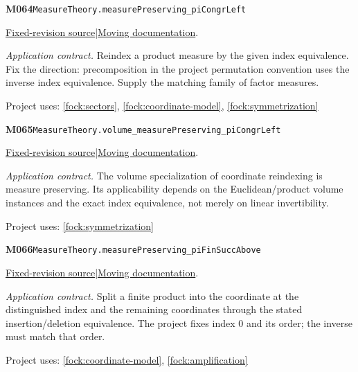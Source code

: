 \documentclass[11pt,a4paper]{article}
\theoremstyle{definition}
\theoremstyle{remark}
\begin{document}
\noindent\textbf{M064}\label{base:M064}\quad\nolinkurl{MeasureTheory.measurePreserving_piCongrLeft}

\href{https://github.com/leanprover-community/mathlib4/blob/9bac2d0692944a775113f7c130fd5e5b4608a854/Mathlib/MeasureTheory/Constructions/Pi.lean}{Fixed-revision source}\quad|\quad\href{https://leanprover-community.github.io/mathlib4_docs/Mathlib/MeasureTheory/Constructions/Pi.html#MeasureTheory.measurePreserving_piCongrLeft}{Moving documentation}.\par
\noindent\textit{Application contract.} Reindex a product measure by the given index equivalence. Fix the direction: precomposition in the project permutation convention uses the inverse index equivalence. Supply the matching family of factor measures.\par
{\small Project uses: \ref{fock:sectors}, \ref{fock:coordinate-model}, \ref{fock:symmetrization}}\par\medskip

\noindent\textbf{M065}\label{base:M065}\quad\nolinkurl{MeasureTheory.volume_measurePreserving_piCongrLeft}

\href{https://github.com/leanprover-community/mathlib4/blob/9bac2d0692944a775113f7c130fd5e5b4608a854/Mathlib/MeasureTheory/Constructions/Pi.lean}{Fixed-revision source}\quad|\quad\href{https://leanprover-community.github.io/mathlib4_docs/Mathlib/MeasureTheory/Constructions/Pi.html#MeasureTheory.volume_measurePreserving_piCongrLeft}{Moving documentation}.\par
\noindent\textit{Application contract.} The volume specialization of coordinate reindexing is measure preserving. Its applicability depends on the Euclidean/product volume instances and the exact index equivalence, not merely on linear invertibility.\par
{\small Project uses: \ref{fock:symmetrization}}\par\medskip

\noindent\textbf{M066}\label{base:M066}\quad\nolinkurl{MeasureTheory.measurePreserving_piFinSuccAbove}

\href{https://github.com/leanprover-community/mathlib4/blob/9bac2d0692944a775113f7c130fd5e5b4608a854/Mathlib/MeasureTheory/Constructions/Pi.lean}{Fixed-revision source}\quad|\quad\href{https://leanprover-community.github.io/mathlib4_docs/Mathlib/MeasureTheory/Constructions/Pi.html#MeasureTheory.measurePreserving_piFinSuccAbove}{Moving documentation}.\par
\noindent\textit{Application contract.} Split a finite product into the coordinate at the distinguished index and the remaining coordinates through the stated insertion/deletion equivalence. The project fixes index $0$ and its order; the inverse must match that order.\par
{\small Project uses: \ref{fock:coordinate-model}, \ref{fock:amplification}}\par\medskip
\end{document}
